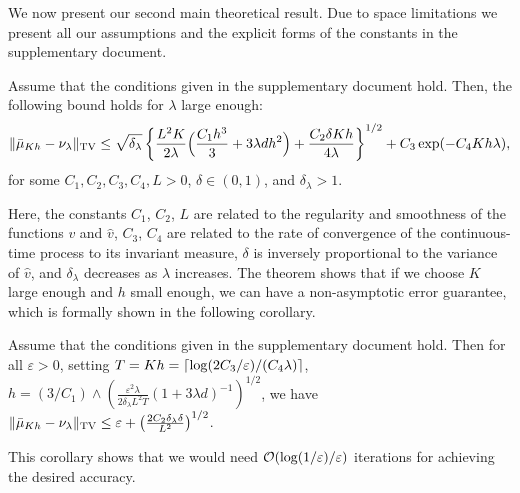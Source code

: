 We now present our second main theoretical result. Due to space limitations we present all our assumptions and the explicit forms of the constants in the supplementary document. 
\vspace{-5pt}
\begin{thm}
\label{thm:euler}
Assume that the conditions given in the supplementary document hold. Then, the following bound holds for $\lambda$ large enough:
\begin{align}
\| \bar{\mu}_{Kh} - \nu_\lambda \|_{\textnormal{TV}} \leq \sqrt{\delta_\lambda} \left \lbrace  \frac{L^2 K}{2\lambda} \Bigl( \frac{C_1 h^3}{3} + 3 \lambda d h^2 \Bigr) + \frac{C_2  \delta K h}{4\lambda} \right \rbrace^{1/2} +  C_3 \exp(-C_4 Kh \lambda),
\end{align} 
for some $C_1,C_2,C_3,C_4,L >0$, $\delta \in (0,1)$, and $\delta_\lambda >1$. %
\end{thm}
Here, the constants $C_1$, $C_2$, $L$ are related to the regularity and smoothness of the functions $v$ and $\hat{v}$, $C_3$, $C_4$ are related to the rate of convergence of the continuous-time process to its invariant measure, $\delta$ is inversely proportional to the variance of $\hat{v}$, and $\delta_\lambda$ decreases as $\lambda$ increases. The theorem shows that 
if we choose $K$ large enough and $h$ small enough, we can have a non-asymptotic error guarantee, which is formally shown in the following corollary. 
\vspace{-5pt}
\begin{cor}
  \label{coro:precision}
  Assume that the conditions given in the supplementary document hold. Then for all $\varepsilon >0$, setting
$T = Kh  = \left\lceil \log(2C_3/\varepsilon)/(C_4\lambda) \right\rceil$, %
$h = (3/C_1)\wedge\left(\frac{\varepsilon^2 \lambda}{2\delta_\lambda L^2 T}(1+3\lambda d)^{-1}\right)^{1/2}$, %
  we have
    $\| \bar{\mu}_{Kh} - \nu_\lambda \|_{\textnormal{TV}} \leq \varepsilon + \left(\frac{2 C_2 \delta_\lambda \delta}{L^2}\right)^{1/2} $. 
\end{cor}
This corollary shows that we would need ${\cal O}(\log(1/\varepsilon)/\varepsilon)$ iterations for achieving the desired accuracy.
